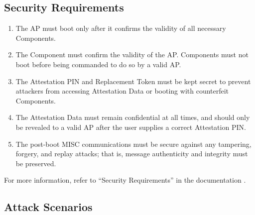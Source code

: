 

\subsection{Security Requirements}
\label{sec:SR}

\begin{enumerate}[label={\textbf{(SR\arabic*)}}, leftmargin=0.55in]
\item The AP must boot only after it confirms the validity of all necessary Components.

\item The Component must confirm the validity of the AP. Components must not boot before being commanded to do so by a valid AP. 

\item The Attestation PIN and Replacement Token must be kept secret to prevent attackers from accessing Attestation Data or booting with counterfeit Components.

\item The Attestation Data must remain confidential at all times, and should only be revealed to a valid AP after the user supplies a correct Attestation PIN.

\item The post-boot MISC communications must be secure against any tampering, forgery, and replay attacks; that is, message authenticity and integrity must be preserved. 
\end{enumerate}

For more information, refer to ``Security Requirements'' in the documentation \cite{eCTFOfficial}.

\subsection{Attack Scenarios}
\label{sec:AS}

